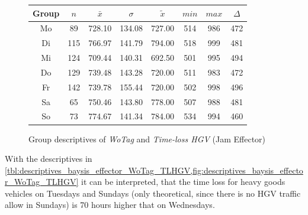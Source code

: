 \begin{figure}[ht!]
	\centering
	\begin{minipage}{0.5\textwidth}
		\tiny
		\setlength{\tabcolsep}{4pt}
		\centering
		\begin{tabular}{c|c|c|c|c|c|c|c}
			\toprule
			Group & $n$ & $\bar{x}$ & $\sigma$ & $\tilde{x}$ & $min$ & $max$ & $\Delta$ \\
			\midrule
			Mo & 89  & 728.10 & 134.08 & 727.00 & 514 & 986 & 472 \\ 
			Di & 115 & 766.97 & 141.79 & 794.00 & 518 & 999 & 481 \\ 
			Mi & 124 & 709.44 & 140.31 & 692.50 & 501 & 995 & 494 \\ 
			Do & 129 & 739.48 & 143.28 & 720.00 & 511 & 983 & 472 \\ 
			Fr & 142 & 739.78 & 155.44 & 720.00 & 502 & 998 & 496 \\ 
			Sa & 65  & 750.46 & 143.80 & 778.00 & 507 & 988 & 481 \\ 
			So & 73  & 774.67 & 141.34 & 784.00 & 534 & 994 & 460 \\ 
			\bottomrule
		\end{tabular}
		\label{tbl:descriptives_baysis_effector_WoTag_TLHGV}
	\end{minipage}%
	\begin{minipage}{0.55\textwidth}
		\data
		\pgfplotstablesort[sort key=mean, sort cmp=float >]{\datasorted}{\data}
		\tiny
		\centering
		\label{fig:descriptives_baysis_effector_WoTag_TLHGV}
	\end{minipage}%
	\caption{Group descriptives of \textit{WoTag} and \textit{Time-loss HGV} (Jam Effector)}
\end{figure}
With the descriptives in \cref{tbl:descriptives_baysis_effector_WoTag_TLHGV,fig:descriptives_baysis_effector_WoTag_TLHGV} it can be interpreted, that the time loss for heavy goods vehicles on Tuesdays and Sundays (only theoretical, since there is no HGV traffic allow in Sundays) is 70 hours higher that on Wednesdays.

